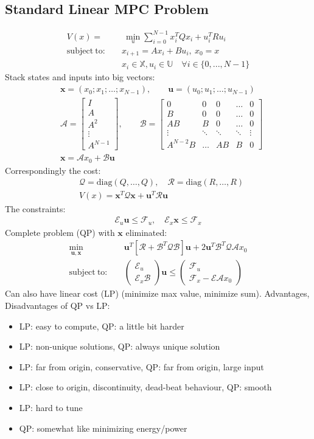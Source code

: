\documentclass[a4paper,landscape,8pt,fleqn]{scrartcl}
\newcommand{\Mn}[1]{\begin{pmatrix}#1\end{pmatrix}} %
\newcommand{\Me}[1]{\begin{bmatrix}#1\end{bmatrix}} %
\newcommand{\mb}[1]{\mathbb{#1}}
\newcommand{\mf}[1]{\mathbf{#1}}
\newcommand{\mc}[1]{\mathcal{#1}}
\begin{document}
\begin{multicols}{3}
\subsection{Standard Linear MPC Problem}
\begin{align*}
	V(x) =&~ \min_u \sum_{i=0}^{N-1} x_i^T Q x_i + u_i^T R u_i \\ 
	\mathrm{subject~to:} \quad& x_{i+1} = A x_i + B u_i,~x_0 = x\\
	& x_i \in \mb{X}, u_i \in \mb{U}\quad \forall i \in \{0,...,N-1\}
\end{align*}
Stack states and inputs into big vectors:
\begin{align*}
	&\mf{x} = (x_0;x_1;\dots;x_{N-1}) ,\qquad \mf{u} = (u_0;u_1;\dots;u_{N-1}) \\
	&\mc{A} = \Me{I \\ A \\ A^2 \\ \vdots \\ A^{N-1}},\qquad \mc{B} = \Me{0 & 0 & 0 & \dots & 0 \\ B & 0 & 0 & \dots & 0 \\ AB  & B & 0 & \dots & 0 \\ \vdots & \ddots & \ddots & \ddots & \vdots \\ A^{N-2}B & \dots & AB & B & 0} \\
	&\mf{x} = \mc{A}x_0 + \mc{B}\mf{u}
\end{align*}
Correspondingly the cost:
\begin{align*}
	&\mc{Q} = \mathrm{diag}(Q,\dots,Q), \quad \mc{R} = \mathrm{diag}(R,\dots,R) \\
	&V(x) = \mf{x}^T \mc{Q} \mf{x} + \mf{u}^T \mc{R} \mf{u} 
\end{align*}
The constraints:
\begin{align*}
	\mc{E}_u \mf{u} \leq \mc{F}_u, \quad \mc{E}_x \mf{x} \leq \mc{F}_x
\end{align*}
Complete problem (QP) with $\mf{x}$ eliminated:
\begin{align*}
	\min_{\mf{u},\mf{x}} &\quad \mf{u}^T \left[ \mc{R} + \mc{B}^T \mc{Q} \mc{B} \right] \mf{u} + 2 \mf{u}^T\mc{B}^T \mc{Q} \mc{A} x_0 \\
	\mathrm{subject~to:} &\quad \Mn{\mc{E}_u \\ \mc{E}_x \mc{B}} \mf{u} \leq \Mn{\mc{F}_u \\ \mc{F}_x - \mc{E} \mc{A} x_0}
\end{align*}
Can also have linear cost (LP) (minimize max value, minimize sum). Advantages, Disadvantages of QP vs LP:
\begin{itemize}
	\item LP: easy to compute, QP: a little bit harder
	\item LP: non-unique solutions, QP: always unique solution
	\item LP: far from origin, conservative, QP: far from origin, large input
	\item LP: close to origin, discontinuity, dead-beat behaviour, QP: smooth
	\item LP: hard to tune
	\item QP: somewhat like minimizing energy/power
\end{itemize}

\end{multicols}
\end{document}
